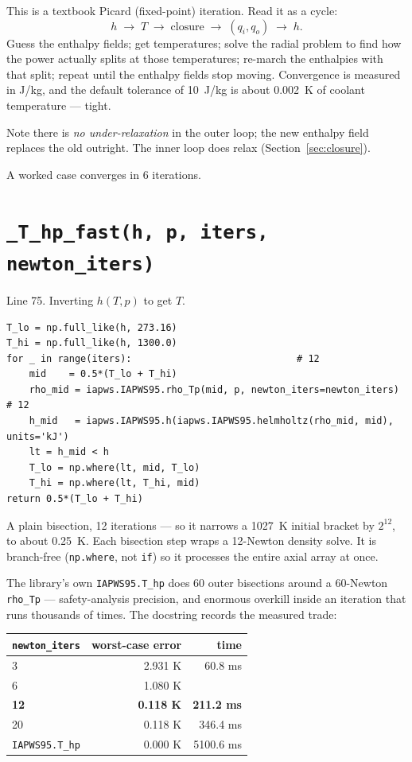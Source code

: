 \documentclass[11pt]{article}
\newcommand{\code}[1]{\texttt{#1}}
\begin{document}
This is a textbook Picard (fixed-point) iteration. Read it as a cycle:
\begin{equation}
h \;\longrightarrow\; T \;\longrightarrow\; \text{closure} \;\longrightarrow\;
(q_i, q_o) \;\longrightarrow\; h .
\end{equation}
Guess the enthalpy fields; get temperatures; solve the radial problem to find how the
power actually splits at those temperatures; re-march the enthalpies with that split;
repeat until the enthalpy fields stop moving. Convergence is measured in J/kg, and the
default tolerance of 10~J/kg is about 0.002~K of coolant temperature --- tight.

Note there is \emph{no under-relaxation} in the outer loop; the new enthalpy field
replaces the old outright. The inner loop does relax (Section~\ref{sec:closure}).

A worked case converges in 6 iterations.

\section{\code{\_T\_hp\_fast(h, p, iters, newton\_iters)}}
Line 75. Inverting $h(T,p)$ to get $T$.

\begin{lstlisting}
T_lo = np.full_like(h, 273.16)
T_hi = np.full_like(h, 1300.0)
for _ in range(iters):                             # 12
    mid    = 0.5*(T_lo + T_hi)
    rho_mid = iapws.IAPWS95.rho_Tp(mid, p, newton_iters=newton_iters)   # 12
    h_mid   = iapws.IAPWS95.h(iapws.IAPWS95.helmholtz(rho_mid, mid), units='kJ')
    lt = h_mid < h
    T_lo = np.where(lt, mid, T_lo)
    T_hi = np.where(lt, T_hi, mid)
return 0.5*(T_lo + T_hi)
\end{lstlisting}

A plain bisection, 12 iterations --- so it narrows a 1027~K initial bracket by $2^{12}$,
to about 0.25~K. Each bisection step wraps a 12-Newton density solve. It is branch-free
(\code{np.where}, not \code{if}) so it processes the entire axial array at once.

The library's own \code{IAPWS95.T\_hp} does 60 outer bisections around a 60-Newton
\code{rho\_Tp} --- safety-analysis precision, and enormous overkill inside an iteration
that runs thousands of times. The docstring records the measured trade:

\begin{center}
\begin{tabular}{lrr}
\toprule
\code{newton\_iters} & worst-case error & time \\
\midrule
3  & 2.931 K & 60.8 ms \\
6  & 1.080 K & \\
\textbf{12} & \textbf{0.118 K} & \textbf{211.2 ms} \\
20 & 0.118 K & 346.4 ms \\
\code{IAPWS95.T\_hp} & 0.000 K & 5100.6 ms \\
\bottomrule
\end{tabular}
\end{center}
\end{document}
